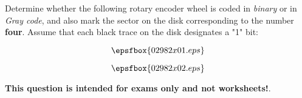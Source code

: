 

Determine whether the following rotary encoder wheel is coded in {\it binary} or in {\it Gray code}, and also mark the sector on the disk corresponding to the number {\bf four}.  Assume that each black trace on the disk designates a "1" bit:

$$\epsfbox{02982x01.eps}$$







$$\epsfbox{02982x02.eps}$$







{\bf This question is intended for exams only and not worksheets!}.




